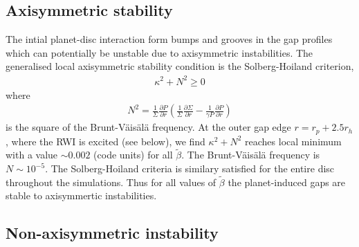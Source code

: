 \subsection{Axisymmetric stability}
The intial planet-disc interaction form bumps and grooves in the gap profiles
which can potentially be unstable due to axisymmetric instabilities. The
generalised local axisymmetric stability condition is the Solberg-Hoiland
criterion,  
\begin{align}
  \kappa^2+N^2 \geq 0 
\end{align}
where
\begin{align}
 N^2=\frac{1}{\Sigma} \frac{\partial P}{\partial r}
 \left(\frac{1}{\Sigma} \frac{\partial \Sigma}{\partial
     r}-\frac{1}{\gamma P} \frac{\partial P}{\partial r}  \right) 
\end{align}
is the square of the Brunt-V\"ais\"al\"a frequency.  
At the outer gap edge $r=r_p+2.5r_h$,  where the RWI is excited
(see below), we find $\kappa^2 + N^2$ reaches local minimum with a value
$\sim 0.002$ (code units) for all $\tilde\beta$. The
Brunt-V\"ais\"al\"a frequency is $N\sim 10^{-5}$. The Solberg-Hoiland
criteria is similary satisfied for the entire disc throughout the
simulations. %
Thus for all values of $\tilde\beta$ the planet-induced gaps are
stable to axisymmertic instabilities. 

\subsection{Non-axisymmetric instability}\label{linear}

